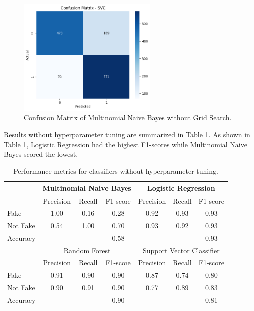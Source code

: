 \begin{figure}[h!]
    \centering
    \includegraphics[width=0.6\textwidth,height=0.6\textheight, keepaspectratio]{figures/hyperparam/SVC_default.png}
        \caption{Confusion Matrix of Multinomial Naive Bayes without Grid Search.}
        \label{SVC_default}
\end{figure}

Results without hyperparameter tuning are summarized in Table \ref{tab:no_hyperparam_summary}. As shown in Table \ref{tab:no_hyperparam_summary}, Logistic Regression had the highest F1-scores while Multinomial Naive Bayes scored the lowest.

\begin{table}[ht]
    \centering
    \begin{tabular}{|l|ccc|ccc|}
    \hline
    & \multicolumn{3}{c|}{Multinomial Naive Bayes} & \multicolumn{3}{c|}{Logistic Regression} \\
    \hline
    & Precision & Recall & F1-score & Precision & Recall & F1-score \\
    \hline
    Fake & 1.00 & 0.16 & 0.28 & 0.92 & 0.93 & 0.93 \\
    Not Fake & 0.54 & 1.00 & 0.70 & 0.93 & 0.92 & 0.93 \\
    Accuracy & & & 0.58 & & & 0.93 \\
    \hline
    & \multicolumn{3}{c|}{Random Forest} & \multicolumn{3}{c|}{Support Vector Classifier} \\
    \hline
    & Precision & Recall & F1-score & Precision & Recall & F1-score \\
    \hline
    Fake & 0.91 & 0.90 & 0.90 & 0.87 & 0.74 & 0.80 \\
    Not Fake & 0.90 & 0.91 & 0.90 & 0.77 & 0.89 & 0.83 \\
    Accuracy & & & 0.90 & & & 0.81 \\
    \hline
    \end{tabular}
    \caption{Performance metrics for classifiers without hyperparameter tuning.}
    \label{tab:no_hyperparam_summary}
\end{table}

